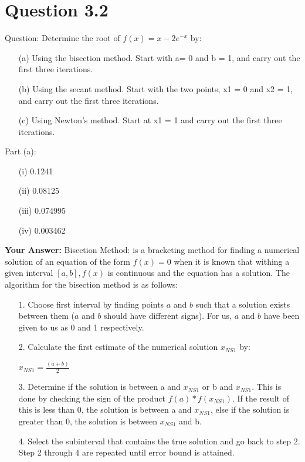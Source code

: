 \documentclass[12pt]{report}
\begin{document}
\section{Question 3.2}
Question: Determine the root of $f(x) = x - 2e^{-x}$ by: 
\begin{itemize}
\item[(a)] Using the bisection method. Start with a= 0 and  b = 1, and carry out the first three iterations.
\item[(b)] Using the secant method. Start with the two points, x1 = 0 and x2 = 1, and carry out the first three iter­ations. 
\item[(c)] Using Newton's method. Start at x1 = 1 and carry out the first three iterations. 
\end{itemize}
Part (a):
\begin{itemize}
\item[(i)] 0.1241
\item[(ii)] 0.08125
\item[(iii)] 0.074995
\item[(iv)] 0.003462
\end{itemize}
\textbf{Your Answer:}
\newline
Bisection Method: is a bracketing method for finding a numerical solution of an equation of the form $f(x) = 0$ when it is known that withing a given interval $[a,b], f(x)$ is continuous and the equation has a solution.
\newline
The algorithm for the bisection method is as follows:
\begin{itemize}
\item[1.] Choose first interval by finding points $a$ and $b$ such that a solution exists between them ($a$ and $b$ should have different signs). For us, $a$ and $b$ have been given to us as 0 and 1 respectively.
\item[2.] Calculate the first estimate of the numerical solution $x_{NS1}$ by:
\begin{center}
$x_{NS1} = \frac{(a+b)}{2}$
\end{center}
\item[3.] Determine if the solution is between a and $x_{NS1}$ or b and $x_{NS1}$. This is done by checking the sign of the product $f(a) * f(x_{NS1})$. If the result of this is less than 0, the solution is between a and $x_{NS1}$, else if the solution is greater than 0, the solution is between $x_{NS1}$ and b.
\item[4.] Select the subinterval that contains the true solution and go back to step 2. Step 2 through 4 are repeated until error bound is attained.
\end{itemize}
\end{document}
